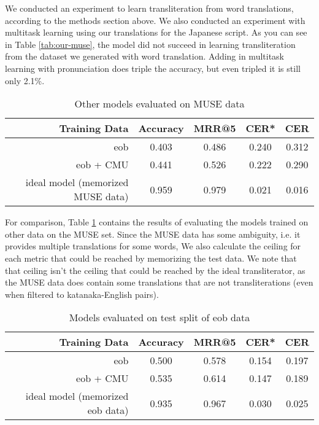 \documentclass{article}
\begin{document}
We conducted an experiment to learn transliteration from word translations,
according to the methods section above.
We also conducted an experiment with multitask learning
using our translations for the Japanese script.
As you can see in Table \ref{tab:our-muse},
the model did not succeed in learning transliteration
from the dataset we generated with word translation.
Adding in multitask learning with pronunciation does triple the accuracy,
but even tripled it is still only 2.1\%.

\begin{table}[h]
  \centering
  \begin{tabular}{r | c c c c}
    Training Data & Accuracy & MRR@5 & CER* & CER \\
    \hline
    eob & 0.403 & 0.486 & 0.240 & 0.312 \\
    eob + CMU & 0.441 & 0.526 & 0.222 & 0.290 \\
    \hline
    ideal model (memorized MUSE data) & 0.959 & 0.979 & 0.021 & 0.016\\
  \end{tabular}
  \caption{Other models evaluated on MUSE data}
  \label{tab:other-muse}
\end{table}

For comparison,
Table \ref{tab:other-muse} contains the results of evaluating
the models trained on other data on the MUSE set.
Since the MUSE data has some ambiguity,
i.e. it provides multiple translations for some words,
We also calculate the ceiling for each metric
that could be reached by memorizing the test data.
We note that that ceiling isn't
the ceiling that could be reached by the ideal transliterator,
as the MUSE data does contain some translations that are not transliterations
(even when filtered to katanaka-English pairs).

\begin{table}[h]
  \centering
  \begin{tabular}{r | c c c c}
    Training Data & Accuracy & MRR@5 & CER* & CER \\
    \hline
    eob & 0.500 & 0.578 & 0.154 & 0.197 \\
    eob + CMU & 0.535 & 0.614 & 0.147 & 0.189 \\
    \hline
    ideal model (memorized eob data) & 0.935 & 0.967 & 0.030 & 0.025 \\
  \end{tabular}
  \caption{Models evaluated on test split of eob data}
  \label{tab:eob-results}
\end{table}
\end{document}
